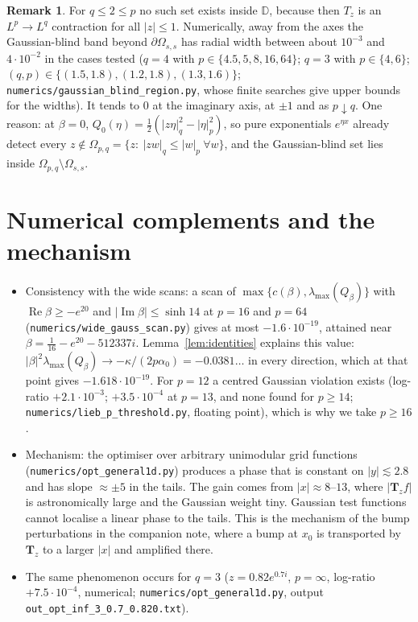 \documentclass[11pt]{amsart}
\theoremstyle{definition}
\newtheorem{remark}[theorem]{Remark}
\newcommand{\Rea}{\operatorname{Re}}
\newcommand{\Ima}{\operatorname{Im}}
\newcommand{\bT}{\mathbf{T}}
\newcommand{\D}{\mathbb{D}}
\begin{document}
\begin{remark}\label{rem:otherq}
For $q\le2\le p$ no such set exists inside $\D$, because then $T_z$ is an $L^p\to L^q$ contraction for all $|z|\le1$.
Numerically, away from the axes the Gaussian-blind band beyond $\partial\Omega_{s,s}$ has radial width between
about $10^{-3}$ and $4\cdot10^{-2}$ in the cases tested ($q=4$ with $p\in\{4.5,5,8,16,64\}$; $q=3$ with $p\in\{4,6\}$;
$(q,p)\in\{(1.5,1.8),(1.2,1.8),(1.3,1.6)\}$; \texttt{numerics/\allowbreak gaussian\_blind\_region.py}, whose finite
searches give upper bounds for the widths). It tends to $0$ at the imaginary axis, at $\pm1$ and as $p\downarrow q$.
One reason: at $\beta=0$, $Q_0(\eta)=\frac12(|z\eta|_q^2-|\eta|_p^2)$, so pure exponentials $e^{\eta x}$ already
detect every $z\notin\Omega_{p,q}=\{z:\ |zw|_q\le|w|_p\ \forall w\}$, and the Gaussian-blind set lies inside
$\Omega_{p,q}\setminus\Omega_{s,s}$.
\end{remark}

\section{Numerical complements and the mechanism}\label{sec:num}
\begin{itemize}
\item Consistency with the wide scans: a scan of $\max\{c(\beta),\lambda_{\max}(Q_\beta)\}$ with $\Rea\beta\ge-e^{20}$ and
$|\Ima\beta|\le\sinh14$ at $p=16$ and $p=64$ (\texttt{numerics/\allowbreak wide\_gauss\_scan.py}) gives at most
$-1.6\cdot10^{-19}$, attained near $\beta=\frac1{16}-e^{20}-512337i$. Lemma~\ref{lem:identities} explains this value:
$|\beta|^2\lambda_{\max}(Q_\beta)\to-\kappa/(2p\alpha_0)=-0.0381\ldots$ in every direction, which at that point gives
$-1.618\cdot10^{-19}$. For $p=12$ a centred Gaussian violation exists (log-ratio $+2.1\cdot10^{-3}$; $+3.5\cdot10^{-4}$ at $p=13$, and none found for $p\ge14$; \texttt{numerics/\allowbreak lieb\_p\_threshold.py}, floating point), which is why we take $p\ge16$.
\item Mechanism: the optimiser over arbitrary unimodular grid functions (\texttt{numerics/\allowbreak opt\_general1d.py})
produces a phase that is constant on $|y|\lesssim2.8$ and has slope $\approx\pm5$ in the tails. The gain comes
from $|x|\approx8$--$13$, where $|\bT_zf|$ is astronomically large and the Gaussian weight tiny. Gaussian test
functions cannot localise a linear phase to the tails. This is the mechanism of the bump perturbations in the
companion note, where a bump at $x_0$ is transported by $\bT_z$ to a larger $|x|$ and amplified there.
\item The same phenomenon occurs for $q=3$ ($z=0.82e^{0.7i}$, $p=\infty$, log-ratio $+7.5\cdot10^{-4}$, numerical; \texttt{numerics/\allowbreak opt\_general1d.py}, output \texttt{out\_opt\_inf\_3\_0.7\_0.820.txt}).
\end{itemize}
\end{document}
